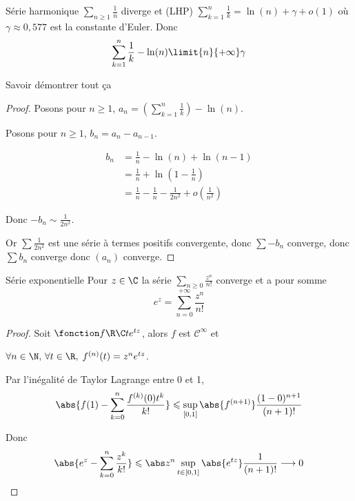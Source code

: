 \begin{proposition}{Série harmonique}{}
    $\displaystyle \sum_{n \geqslant 1} \frac 1 n$ diverge et (LHP)
    $\displaystyle \sum_{k = 1 }^{n } \frac 1 k = \ln(n) + \gamma + o(1)$ où $\gamma \approx 0,577$ est la constante d'Euler.
    Donc 
    $$\displaystyle \sum_{k = 1}^{n} \frac 1 k - \ln(n) \limit{n}{+ \infty} \gamma$$
\end{proposition}

Savoir démontrer tout ça 


\begin{proof}
    Posons pour $n \geqslant 1$, $\displaystyle a_n = \left( \sum_{k = 1 }^{n } \frac 1 k \right) - \ln(n)$.

    Posons pour $n \geqslant 1$, $b_n = a_n - a_{n - 1}$. 

    \begin{align*}
        b_n & = \frac 1 n - \ln(n) + \ln(n - 1) \\
            & = \frac 1 n + \ln\left( 1 - \frac 1 n \right) \\
            & = \frac 1 n -  \frac 1 n - \frac 1 {2 n^2} + o\left( \frac 1 {n^2} \right) 
    \end{align*}

    Donc $- b_n \sim \frac 1 {2 n^2}$.

    Or $\sum \frac 1 {2 n^2}$ est une série à termes positifs convergente, donc 
    $\sum - b_n$ converge, donc $\sum b_n$ converge donc $(a_n)$ converge.
\end{proof}

\begin{proposition}{Série exponentielle}{}
    Pour $z \in \C$ la série $\sum_{n \geqslant 0} \frac{z^n}{n!}$ converge et a pour somme 
    $$e^z = \sum_{n = 0}^{+\infty} \frac{z^n}{n!}$$
\end{proposition}


\begin{proof}
    Soit $\fonction f \R \C t {e^{tz}}$, alors $f$ est $\mathscr C^\infty$ et 
    
    $\forall n \in \N, \, \forall t \in \R, \; f^{(n)}(t) = z^n e^{tz}$.

    Par l'inégalité de Taylor Lagrange entre 0 et 1, 
    $$\abs{f(1) - \sum_{k = 0}^{n} \frac{f^{(k)}(0)t^k}{k!}} \leqslant \sup_{[0, 1]}\abs{f^{(n + 1)}} \frac{(1 - 0)^{n + 1}}{(n + 1)!}$$

    Donc 
    $$\abs{e^z - \sum_{k = 0 }^{n }\frac{z^k}{k!}} \leqslant \abs z ^n \sup_{t \in [0, 1]} \abs{e^{tz}} \frac{1}{(n + 1)!} \longrightarrow 0$$
\end{proof}

